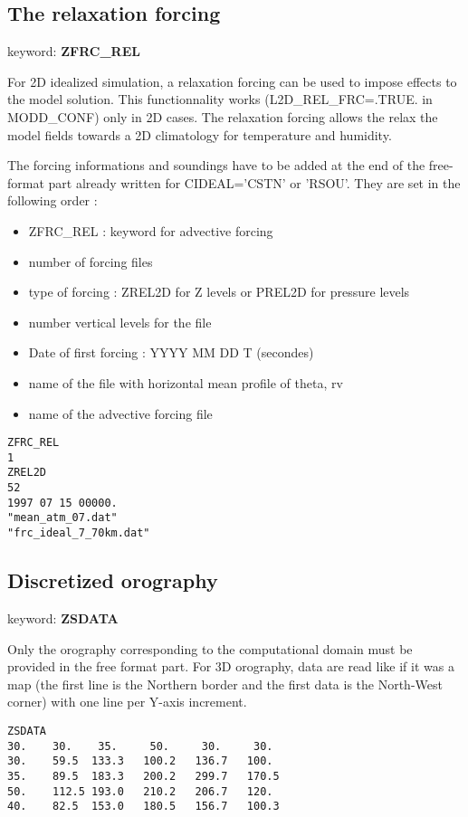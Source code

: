 \subsection{The relaxation forcing} \label{ss:rel_forcing}

keyword: {\bf ZFRC\_REL} 

For 2D idealized simulation, a relaxation forcing can be used to impose effects to the model solution. This functionnality works (L2D\_REL\_FRC=.TRUE. in MODD\_CONF) only in 2D cases.  The relaxation forcing allows the relax the model fields towards a 2D climatology for temperature and humidity.
         
The forcing informations and soundings have to be added at the end of the
free-format part already written for CIDEAL='CSTN' or 'RSOU'. They are set in the following order : 
\begin{itemize}
\item ZFRC\_REL : keyword for advective forcing
\item number of forcing files
\item type of forcing : ZREL2D for Z levels or PREL2D for  pressure levels
\item number vertical levels for the file
\item Date of first forcing : YYYY MM DD T (secondes)
\item name of the file with horizontal mean profile of theta, rv
\item name of the advective forcing file
\end{itemize}

                                   
\begin{verbatim}
ZFRC_REL
1
ZREL2D
52
1997 07 15 00000.
"mean_atm_07.dat"
"frc_ideal_7_70km.dat"
\end{verbatim}

\subsection{Discretized orography}

keyword: {\bf ZSDATA}

Only the orography corresponding to the computational domain must be
provided in the free format part. For 3D orography, data are read like if it
was a map (the first line is the Northern border and the first data
is the North-West corner) with one line per Y-axis increment.

\begin{verbatim}
ZSDATA
30.    30.    35.     50.     30.     30.
30.    59.5  133.3   100.2   136.7   100.
35.    89.5  183.3   200.2   299.7   170.5
50.    112.5 193.0   210.2   206.7   120.
40.    82.5  153.0   180.5   156.7   100.3
\end{verbatim}



